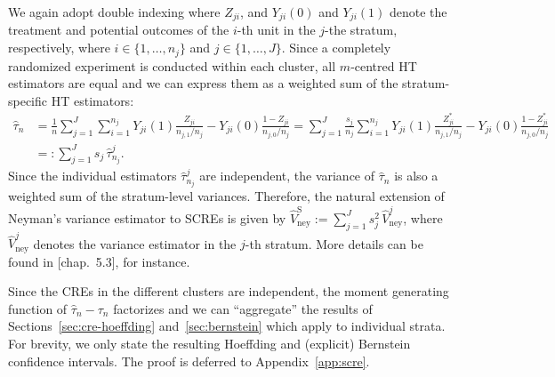\documentclass[aos]{imsart2}
\theoremstyle{plain}
\theoremstyle{definition}
\newcommand{\vhn}{\hat{V}_{\mathrm{ney}}}
\newcommand{\vhns}{\vhn^\mathrm{S}}
\newcommand{\tauh}{\hat{\tau}}
\begin{document}
We again adopt double indexing where $Z_{ji}$, and $Y_{ji}(0)$ and $Y_{ji}(1)$ denote the treatment and potential outcomes of the $i$-th unit in the $j$-the stratum, respectively, where $i\in\{1,\ldots,n_j\}$ and $j\in\{1,\ldots,J\}$. Since a completely randomized experiment is conducted within each cluster, all $m$-centred HT estimators are equal and we can express them as a weighted sum of the stratum-specific HT estimators:
\begin{align*}
    \tauh_n &= \frac{1}{n} \sum_{j=1}^J \sum_{i=1}^{n_j} Y_{ji}(1) \frac{Z_{ji}}{n_{j,1}/n_j} - Y_{ji}(0) \frac{1-Z_{ji}}{n_{j,0}/n_j}= \sum_{j=1}^J \frac{s_j}{n_j} \sum_{i=1}^{n_j} Y_{ji}(1) \frac{Z_{ji}^*}{n_{j,1}/n_j} - Y_{ji}(0) \frac{1-Z_{ji}^*}{n_{j,0}/n_j}\\
    &=: \sum_{j=1}^J s_j \, \tauh_{n_j}^j.
\end{align*}
Since the individual estimators $\tauh_{n_j}^j$ are independent, the variance of $\tauh_n$ is also a weighted sum of the stratum-level variances. Therefore, the natural extension of Neyman's variance estimator to SCREs is given by $\vhns := \sum_{j=1}^J s_j^2\, \vhn^j$, where $\vhn^j$ denotes the variance estimator in the $j$-th stratum. More details can be found in \citet{ding_first_2024}[chap.~5.3], for instance.

Since the CREs in the different clusters are independent, the moment generating function of $\tauh_n-\tau_n$ factorizes and we can ``aggregate'' the results of Sections~\ref{sec:cre-hoeffding} and~\ref{sec:bernstein} which apply to individual strata. For brevity, we only state the resulting Hoeffding and (explicit) Bernstein confidence intervals. The proof is deferred to Appendix~\ref{app:scre}.
\end{document}
